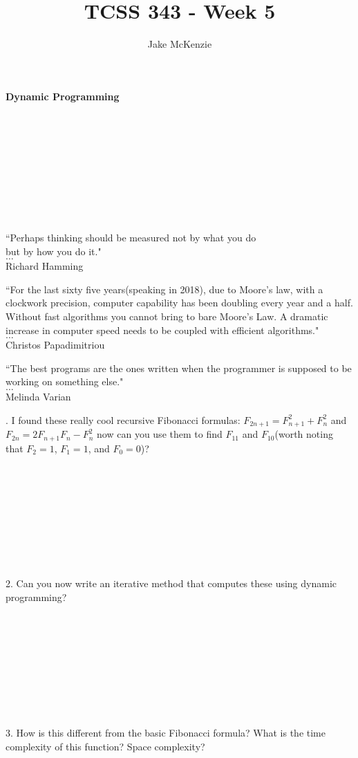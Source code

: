 \documentclass[12pt]{article}
\begin{document}
\title{TCSS 343 - Week 5}
\author{Jake McKenzie}
\maketitle
\noindent\centerline{\textbf{Dynamic Programming}}\\\\\\\\\\\\\\\\
\begin{center}
    ``Perhaps thinking should be measured not by what you do \\but by how you do it." \\$\dots$\\ Richard Hamming
\end{center}
\begin{center}
    ``For the last sixty five years(speaking in 2018), due to Moore's law, with a clockwork precision, computer capability has been doubling every year and a half. Without fast algorithms you cannot bring to bare Moore's Law. A dramatic increase in computer speed needs to be coupled with efficient algorithms." \\$\dots$\\ Christos Papadimitriou
\end{center}
\begin{center}
    ``The best programs are the ones written when the programmer is supposed to be working on something else." \\$\dots$\\ Melinda Varian
\end{center}
\newpage
{}. I found these really cool recursive Fibonacci formulas: 
$F_{2n+1}=F_{n+1}^{2}+F_{n}^{2}$ and $F_{2n}=2F_{n+1}F_{n}-F_{n}^2$
 now can you use them to find $F_{11}$ and $F_{10}$(worth noting that
 $F_2 = 1$, $F_1 = 1$, and $F_0 = 0$)?\\\\\\\\\\\\\\\\\\\\
 2. Can you now write an iterative method that computes these 
 using dynamic programming?\\\\\\\\\\\\\\\\\\\\
 3. How is this different from the basic Fibonacci formula? What is the
 time complexity of this function? Space complexity?
\end{document}
